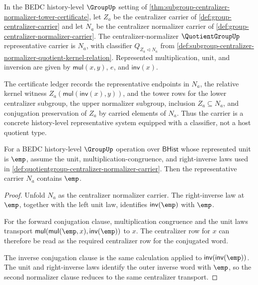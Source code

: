\begin{definition}
\label{def:quotientgroup-centralizer-normalizer-carrier}
In the BEDC history-level $\GroupUp$ setting of
\autoref{thm:subgroup-centralizer-normalizer-tower-certificate}, let $Z_a$
be the centralizer carrier of \autoref{def:group-centralizer-carrier} and let
$N_a$ be the centralizer normalizer carrier of
\autoref{def:group-centralizer-normalizer-carrier}. The
centralizer-normalizer $\QuotientGroupUp$ representative carrier is $N_a$,
with classifier
$Q_{Z_a\triangleleft N_a}$ from
\autoref{def:subgroup-centralizer-normalizer-quotient-kernel-relation}.
Represented multiplication, unit, and inversion are given by
$\mathsf{mul}(x,y)$, $e$, and $\mathsf{inv}(x)$.

The certificate ledger records the representative endpoints in $N_a$, the
relative kernel witness
$Z_a(\mathsf{mul}(\mathsf{inv}(x),y))$, and the tower rows for the lower
centralizer subgroup, the upper normalizer subgroup, inclusion
$Z_a\subseteq N_a$, and conjugation preservation of $Z_a$ by carried elements
of $N_a$. Thus the carrier is a concrete history-level representative system
equipped with a classifier, not a host quotient type.
\end{definition}

\begin{theorem}
\label{thm:quotientgroup-centralizer-normalizer-empty-representative}
For a BEDC history-level $\GroupUp$ operation over $\mathsf{BHist}$ whose
represented unit is $\emp$, assume the unit, multiplication-congruence, and
right-inverse laws used in
\autoref{def:quotientgroup-centralizer-normalizer-carrier}. Then the
representative carrier $N_a$ contains $\emp$.
\end{theorem}
\begin{proof}
Unfold $N_a$ as the centralizer normalizer carrier. The right-inverse law at
$\emp$, together with the left unit law, identifies $\mathsf{inv}(\emp)$ with
$\emp$.

For the forward conjugation clause, multiplication congruence and the unit laws
transport $\mathsf{mul}(\mathsf{mul}(\emp,x),\mathsf{inv}(\emp))$ to $x$. The
centralizer row for $x$ can therefore be read as the required centralizer row
for the conjugated word.

The inverse conjugation clause is the same calculation applied to
$\mathsf{inv}(\mathsf{inv}(\emp))$. The unit and right-inverse laws identify the
outer inverse word with $\emp$, so the second normalizer clause reduces to the
same centralizer transport.
\end{proof}

